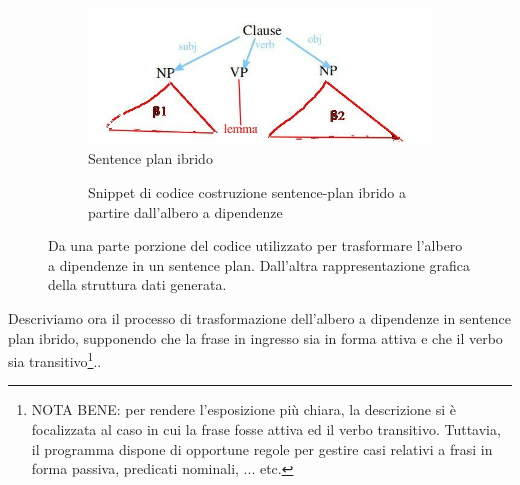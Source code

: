 		\begin{figure}[ht]
		\centering
		\begin{subfigure}{.4\textwidth}
			\centering
			\includegraphics[width=1\linewidth]{./img/fase2_transfer}
			\caption{Sentence plan ibrido}
			\label{fig:tree_transfer}
		\end{subfigure}%
		\begin{subfigure}{.6\textwidth}
			\centering
			  
			\caption{Snippet di codice costruzione sentence-plan ibrido a partire dall'albero a dipendenze}
			\label{fig:code_transfer}
		\end{subfigure}
		\caption{Da una parte porzione del codice utilizzato per trasformare l'albero a dipendenze in un sentence plan. Dall'altra rappresentazione grafica della struttura dati generata. }
		\label{fig:transfer}
	\end{figure}
Descriviamo ora il processo di trasformazione dell'albero a dipendenze in sentence plan ibrido,
supponendo che la frase in ingresso sia in forma attiva e che il verbo sia transitivo\footnote{NOTA BENE: per rendere l'esposizione più chiara, la descrizione si è focalizzata al caso in cui la frase fosse attiva ed il verbo transitivo. Tuttavia, il programma dispone di opportune regole per gestire casi relativi a frasi in forma passiva, predicati nominali, ... etc.}.. \\

